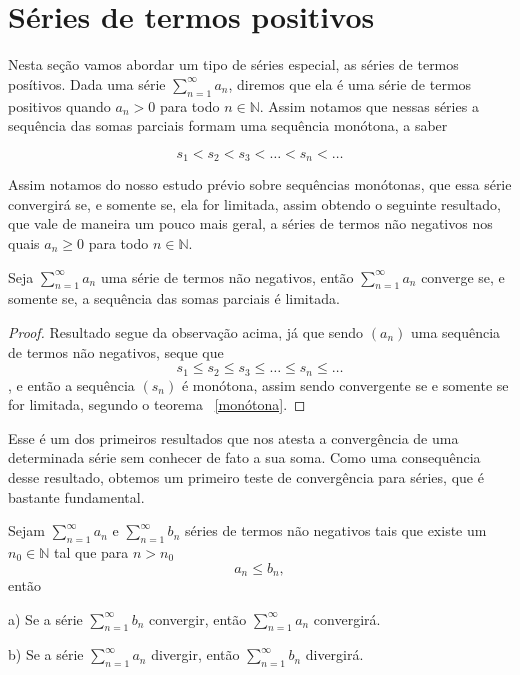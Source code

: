 \section{Séries de termos positivos}
\construirSec

Nesta seção vamos abordar um tipo de séries especial, as séries de termos 
posítivos. Dada uma série $\sum_{n = 1}^{\infty} a_n$, diremos que ela é uma
série de termos positivos quando $a_n > 0$ para todo $n \in \mathbb{N}$. Assim
notamos que nessas séries a sequência das somas parciais formam uma sequência
monótona, a saber

$$ s_1 < s_2 < s_3 < \dots < s_n < \dots$$

Assim notamos do nosso estudo prévio sobre sequências monótonas, que essa série
convergirá se, e somente se, ela for limitada, assim obtendo o seguinte resultado,
que vale de maneira um pouco mais geral, a séries de termos não negativos nos
quais $a_n \geq 0$ para todo $n \in \mathbb{N}$.

\begin{teo}\label{séries termos positivos}
    Seja $\sum_{n = 1}^{\infty} a_n$ uma série de termos não negativos, então 
    $\sum_{n = 1}^{\infty} a_n$ converge se, e somente se, a sequência das somas
    parciais é limitada.
\end{teo}

\begin{proof}
    Resultado segue da observação acima, já que sendo $(a_n)$ uma sequência de
    termos não negativos, seque que 
    $$ s_1 \leq s_2 \leq s_3 \leq \dots \leq s_n \leq \dots$$,
    e então a sequência $(s_n)$ é monótona, assim sendo convergente se e somente
    se for limitada, segundo o teorema ~\ref{monótona}.
\end{proof}

Esse é um dos primeiros resultados que nos atesta a convergência de uma 
determinada série sem conhecer de fato a sua soma. Como uma consequência desse
resultado, obtemos um primeiro teste de convergência para séries, que é bastante
fundamental.

\begin{teo}\label{comparação}
    Sejam $\sum_{n = 1}^{\infty} a_n$ e $\sum_{n = 1}^{\infty} b_n$ séries de
    termos não negativos tais que existe um $n_0 \in \mathbb{N}$ tal que para
    $n>n_0$
    $$a_n \leq b_n,$$
    então
    \item [a)] Se a série $\sum_{n = 1}^{\infty} b_n$ convergir, então
    $\sum_{n = 1}^{\infty} a_n$ convergirá.
    \item [b)] Se a série $\sum_{n = 1}^{\infty} a_n$ divergir,
    então $\sum_{n = 1}^{\infty} b_n$ divergirá.
\end{teo}

